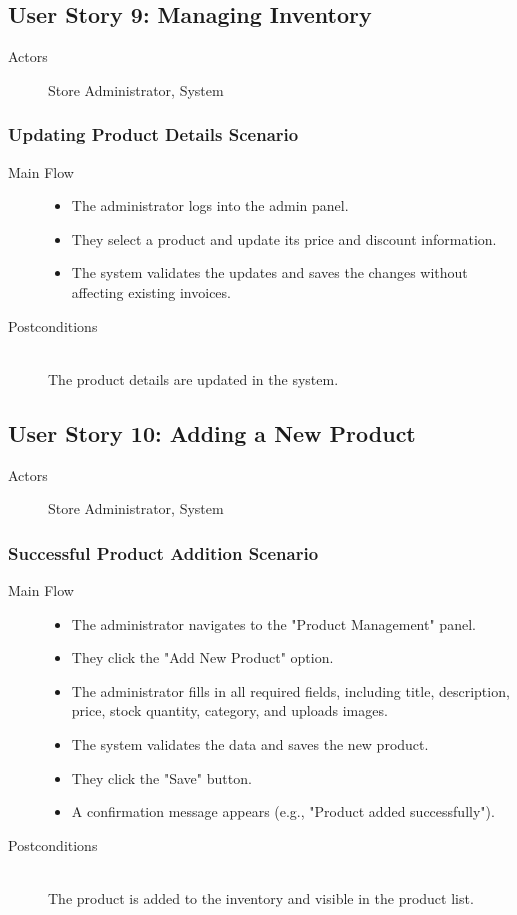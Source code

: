 \documentclass[a4paper,journal]{IEEEtran}
\begin{document}
\subsection{User Story 9: Managing Inventory}
\begin{description}
  \item[Actors] Store Administrator, System
\end{description}
\subsubsection{Updating Product Details Scenario}
\begin{description}
  \item[Main Flow] \hfill
    \begin{itemize}
      \item The administrator logs into the admin panel.
      \item They select a product and update its price and discount information.
      \item The system validates the updates and saves the changes without
        affecting existing invoices.
    \end{itemize}
  \item[Postconditions] \hfill \\ The product details are updated in the system.
\end{description}

\subsection{User Story 10: Adding a New Product}
\begin{description}
  \item[Actors] Store Administrator, System
\end{description}
\subsubsection{Successful Product Addition Scenario}
\begin{description}
  \item[Main Flow] \hfill
    \begin{itemize}
      \item The administrator navigates to the "Product Management" panel.
      \item They click the "Add New Product" option.
      \item The administrator fills in all required fields, including title,
        description, price, stock quantity, category, and uploads images.
      \item The system validates the data and saves the new product.
      \item They click the "Save" button.
      \item A confirmation message appears (e.g., "Product added successfully").
    \end{itemize}
  \item[Postconditions] \hfill \\
    The product is added to the inventory and visible in the product list.
\end{description}
\end{document}
